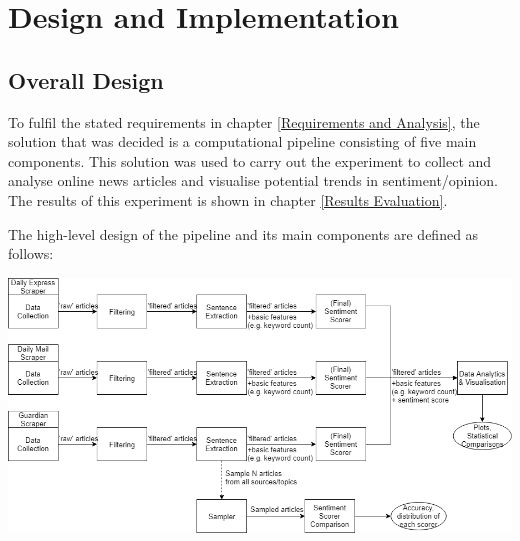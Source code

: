 \documentclass{report}
\begin{document}


\chapter{Design and Implementation} \label{Design and Implementation} %

\section{Overall Design} \label{Overall Design}

To fulfil the stated requirements in chapter \ref{Requirements and Analysis}, the solution that was decided is a computational pipeline consisting of five main components.
This solution was used to carry out the experiment to collect and analyse online news articles and visualise potential trends in sentiment/opinion.
The results of this experiment is shown in chapter \ref{Results Evaluation}.

The high-level design of the pipeline and its main components are defined as follows:

\vspace{0.5em}
\noindent
\includegraphics[width=\textwidth]{overall-design.png}
\end{document}
